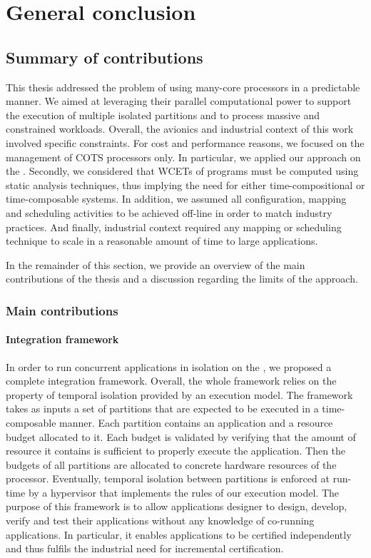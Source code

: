 \documentclass[main.tex]{subfiles}
\begin{document}
\chapter{General conclusion}
\thispagestyle{chapstyle}
\label{chap_conclu}
\minitoc

\section{Summary of contributions}
This thesis addressed the problem of using many-core processors in a
predictable manner. We aimed at leveraging their parallel computational power
to support the execution of multiple isolated partitions and to process massive
and constrained workloads. Overall, the avionics and industrial context of this
work involved specific constraints. For cost and performance reasons, we
focused on the management of COTS processors only. In particular, we applied
our approach on the \mppalong. Secondly, we considered that WCETs of programs
must be computed using static analysis techniques, thus implying the need for
either time-compositional or time-composable systems. In addition, we assumed
all configuration, mapping and scheduling activities to be achieved off-line in
order to match industry practices. And finally, industrial context required any
mapping or scheduling technique to scale in a reasonable amount of time to
large applications.

In the remainder of this section, we provide an overview of the main
contributions of the thesis and a discussion regarding the limits of the
approach.

\subsection{Main contributions} \subsubsection{Integration framework} In order
to run concurrent applications in isolation on the \mppalong, we proposed a
complete integration framework. Overall, the whole framework relies on the
property of temporal isolation provided by an execution model. The framework
takes as inputs a set of partitions that are expected to be executed in a
time-composable manner. Each partition contains an application and a resource
budget allocated to it. Each budget is validated by verifying that the amount
of resource it contains is sufficient to properly execute the application. Then
the budgets of all partitions are allocated to concrete hardware resources of
the processor. Eventually, temporal isolation between partitions is enforced at
run-time by a hypervisor that implements the rules of our execution model. The
purpose of this framework is to allow applications designer to design, develop,
verify and test their applications without any knowledge of co-running
applications. In particular, it enables applications to be certified
independently and thus fulfils the industrial need for incremental
certification. 
\end{document}
